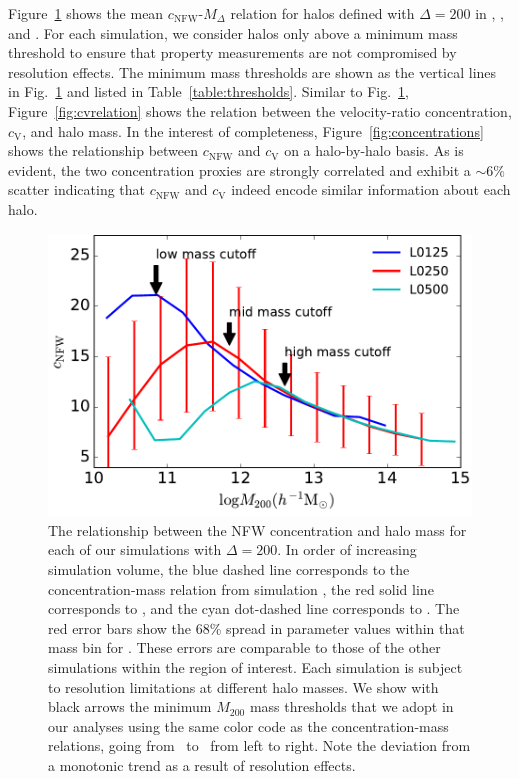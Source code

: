 \documentclass[usenatbib]{mnras}
\begin{document}
Figure~\ref{fig:cnfwrelation} shows the mean $c_{\mathrm{NFW}}$-$M_{\Delta}$ relation for halos defined with
$\Delta=200$ in \simA, \simB, and \simC. For each simulation, we consider halos only above a minimum mass threshold 
to ensure that property measurements are not compromised by resolution effects. The minimum mass 
thresholds are shown as the vertical lines in Fig.~\ref{fig:cnfwrelation} and listed in Table~\ref{table:thresholds}. 
Similar to Fig.~\ref{fig:cnfwrelation}, Figure~\ref{fig:cvrelation} shows the relation between the 
velocity-ratio concentration, $c_{\mathrm{V}}$, and halo mass. 
In the interest of completeness, Figure~\ref{fig:concentrations} shows the relationship 
between $c_{\mathrm{NFW}}$ and $c_{\mathrm{V}}$ on a halo-by-halo basis. As is evident, 
the two concentration proxies are strongly correlated and exhibit a $\sim 6\%$ scatter indicating 
that $c_{\mathrm{NFW}}$ and $c_{\mathrm{V}}$ indeed encode similar information about each 
halo.

\begin{figure}
\centering
\includegraphics[width=.5\textwidth]{masscut_cNFW_d200.pdf}
\caption{The relationship between the NFW concentration and halo mass for each of our simulations with $\Delta =200$. 
In order of increasing simulation volume, the blue dashed line corresponds to the concentration-mass relation from simulation 
\simA, the red solid line corresponds to \simB, and the cyan dot-dashed line corresponds to \simC. The red error bars show the 68\% spread in
parameter values within that mass bin for \simB. These errors are comparable to those of the other simulations
within the region of interest.
Each simulation is subject to resolution limitations at different halo masses. We show with black arrows 
the minimum $M_{200}$ mass thresholds that we adopt in our analyses using the same color code as 
the concentration-mass relations, going from \simA \ to \simC \ from left to right. Note the deviation from a monotonic trend as a result of resolution effects.}
\label{fig:cnfwrelation}
\end{figure}
\end{document}

